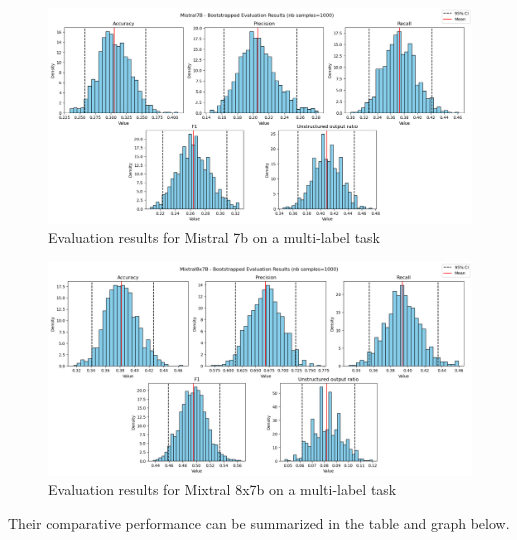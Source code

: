 \documentclass[11pt]{article}
\begin{document}
\begin{figure}[h]
    \centering
    \includegraphics[width=\linewidth]{images//mistral//multilabel/mistral7b.png}
    \caption{Evaluation results for Mistral 7b on a multi-label task}
    \label{fig:enter-label}
\end{figure}

\begin{figure}[h]
    \centering
    \includegraphics[width=\linewidth]{images//mistral//multilabel/mixtral8x7b.png}
    \caption{Evaluation results for Mixtral 8x7b on a multi-label task}
    \label{fig:enter-label}
\end{figure}

Their comparative performance can be summarized in the table and graph below.

\newpage

\begin{table}[h]
    \centering
    \caption{Multi-label task: comparing Mistral 7b and Mixtral 8x7b}
    \label{tab:my_label}
\end{table}
\end{document}
